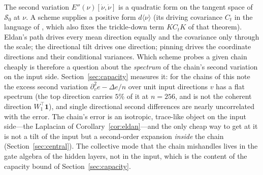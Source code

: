 \begin{remark}\label{rem:visibility}
The second variation $E''(\nu)[\dot\nu,\dot\nu]$ is a quadratic form on the tangent space of $\mathcal S_0$ at $\nu$.
A scheme supplies a positive form $d\langle\nu\rangle$ (its driving covariance $C_t$ in the language of
\cite[Thm.~3.3]{stage8}, which also fixes the trickle-down term $KC_tK$ of that theorem). Eldan's path drives every
mean direction equally and the covariance only through the scale; the directional tilt drives one direction; pinning
drives the coordinate directions and their conditional variances. Which scheme probes a given chain cheaply is
therefore a question about the \emph{spectrum} of the chain's second variation on the input side. Section~\ref{sec:capacity}
measures it: for the chains of this note the excess second variation $\partial_v^2e-\Delta e/n$ over unit input
directions $v$ has a flat spectrum (the top direction carries $5\%$ of it at $n=256$, and is not the coherent
direction $W_1^{\top}\mathbf 1$), and single directional second differences are nearly uncorrelated with the error.
The chain's error is an isotropic, trace-like object on the input side---the Laplacian of Corollary~\ref{cor:eldan}---and
the only cheap way to get at it is not a tilt of the input but a second-order expansion \emph{inside} the chain
(Section~\ref{sec:central}). The collective mode that the chain mishandles lives in the gate algebra of the hidden
layers, not in the input, which is the content of the capacity bound of Section~\ref{sec:capacity}.
\end{remark}
